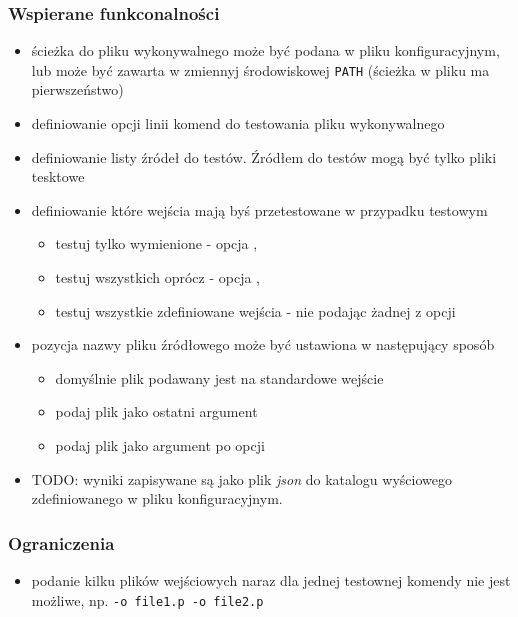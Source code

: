 \documentclass[a4paper,12pt]{article}
\begin{document}
\subsubsection{Wspierane funkconalności}

\begin{itemize}
  \item ścieżka do pliku wykonywalnego może być podana w pliku konfiguracyjnym, lub może być zawarta w zmiennyj środowiskowej \texttt{PATH} (ścieżka w pliku ma pierwszeństwo)
  \item definiowanie opcji linii komend do testowania pliku wykonywalnego
  \item definiowanie listy źródeł do testów. Źródłem do testów mogą być tylko pliki tesktowe
  \item definiowanie które wejścia mają byś przetestowane w przypadku testowym
    \begin{itemize}
      \item testuj tylko wymienione - opcja ,
      \item testuj wszystkich oprócz - opcja ,
      \item testuj wszystkie zdefiniowane wejścia - nie podając żadnej z opcji
    \end{itemize}
  \item pozycja nazwy pliku źródłowego może być ustawiona w następujący sposób
    \begin{itemize}
      \item domyślnie plik podawany jest na standardowe wejście
      \item podaj plik jako ostatni argument 
      \item podaj plik jako argument po opcji 
    \end{itemize}
  \item TODO: wyniki zapisywane są jako plik \textit{json} do katalogu wyściowego zdefiniowanego w pliku konfiguracyjnym.
\end{itemize}

\subsubsection{Ograniczenia}

\begin{itemize}
  \item podanie kilku plików wejściowych naraz dla jednej testownej komendy nie jest możliwe, np. \texttt{-o file1.p -o file2.p}
\end{itemize}
\end{document}
